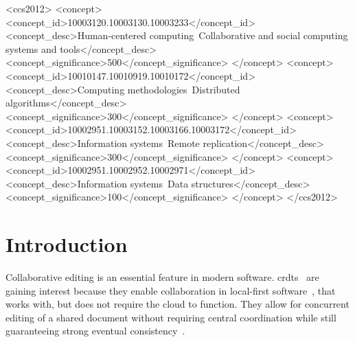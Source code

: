 \documentclass[sigplan,natbib=false,review]{acmart}
\begin{document}
\begin{CCSXML}
<ccs2012>
   <concept>
       <concept_id>10003120.10003130.10003233</concept_id>
       <concept_desc>Human-centered computing~Collaborative and social computing systems and tools</concept_desc>
       <concept_significance>500</concept_significance>
       </concept>
   <concept>
       <concept_id>10010147.10010919.10010172</concept_id>
       <concept_desc>Computing methodologies~Distributed algorithms</concept_desc>
       <concept_significance>300</concept_significance>
       </concept>
   <concept>
       <concept_id>10002951.10003152.10003166.10003172</concept_id>
       <concept_desc>Information systems~Remote replication</concept_desc>
       <concept_significance>300</concept_significance>
       </concept>
   <concept>
       <concept_id>10002951.10002952.10002971</concept_id>
       <concept_desc>Information systems~Data structures</concept_desc>
       <concept_significance>100</concept_significance>
       </concept>
 </ccs2012>
\end{CCSXML}




\maketitle

\section{Introduction}\label{sec:introduction}

Collaborative editing is an essential feature in modern software.
\glspl*{crdt}~\cite{preguicca2018conflict} are gaining interest because they
enable collaboration in local-first software~\cite{kleppmann2019local},
that works with, but does not require the cloud to function.
They allow for concurrent editing of a shared document without requiring
central coordination while still guaranteeing strong eventual
consistency~\cite{shapiro2011comprehensive}.
\end{document}
